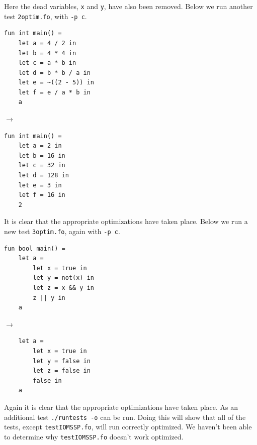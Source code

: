 \documentclass[11pt]{article}
\begin{document}
	Here the dead variables, \texttt{x} and \texttt{y}, have also been removed. Below we run another test \texttt{2optim.fo},
	with \texttt{-p c}. \\
	\begin{center}
	\begin{minipage}{.5\textwidth}
	\begin{lstlisting}
fun int main() =
    let a = 4 / 2 in
    let b = 4 * 4 in
    let c = a * b in
    let d = b * b / a in
    let e = ~((2 - 5)) in
    let f = e / a * b in
    a
	\end{lstlisting}
	\end{minipage}%
	\begin{minipage}{.1\textwidth}
	$\rightarrow$
	\end{minipage}%
	\begin{minipage}{.4\textwidth}
	\begin{lstlisting}
fun int main() =
    let a = 2 in
    let b = 16 in
    let c = 32 in
    let d = 128 in
    let e = 3 in
    let f = 16 in
    2
	\end{lstlisting}
	\end{minipage}
	\end{center}
	It is clear that the appropriate optimizations have taken place. Below we run a new test \texttt{3optim.fo}, again with \texttt{-p c}.
	\begin{center}
	\begin{minipage}{.5\textwidth}
	\begin{lstlisting}
fun bool main() =
    let a =
        let x = true in
        let y = not(x) in
        let z = x && y in
        z || y in
    a
	\end{lstlisting}
	\end{minipage}%
	\begin{minipage}{.1\textwidth}
	$\rightarrow$
	\end{minipage}%
	\begin{minipage}{.4\textwidth}
	\begin{lstlisting}
    let a =
        let x = true in
        let y = false in
        let z = false in
        false in
    a
	\end{lstlisting}
	\end{minipage}
	\end{center}
	Again it is clear that the appropriate optimizations have taken place. As an additional test
	\texttt{./runtests -o} can be run. Doing this will show that all of the tests, except \texttt{testIOMSSP.fo}, will run correctly optimized.
	We haven't been able to determine why \texttt{testIOMSSP.fo} doesn't work optimized.
\end{document}
